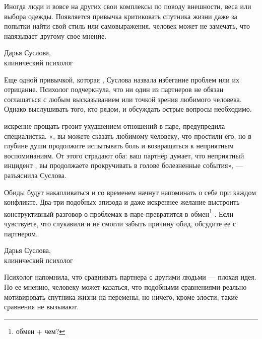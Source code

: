 \begin{fancyquotes}
    Иногда люди и вовсе  на других свои комплексы по поводу внешности, веса или выбора одежды. Появляется привычка критиковать спутника жизни даже за попытки найти свой стиль или самовыражения.  человек может не замечать, что навязывает другому свое мнение.

    \begin{flushright}
        Дарья Суслова,\\
        клинический психолог
    \end{flushright}
\end{fancyquotes}

Еще одной привычкой, которая  , Суслова назвала избегание проблем или их отрицание. Психолог подчеркнула, что ни один из партнеров не обязан соглашаться с любым высказыванием или точкой зрения любимого человека. Однако выслушивать того, кто рядом, и обсуждать острые вопросы необходимо.

 искренне прощать грозит ухудшением отношений в паре, предупредила специалистка. «, вы можете сказать любимому человеку, что простили его, но в глубине души продолжите испытывать боль и  возвращаться к неприятным воспоминаниям. От этого страдают оба: ваш партнёр думает, что неприятный инцидент , вы продолжаете прокручивать в голове болезненные события», — разъяснила Суслова.


\begin{fancyquotes}
    Обиды будут накапливаться и со временем начнут напоминать о себе при каждом конфликте. Два-три подобных эпизода и даже искреннее желание выстроить конструктивный разговор о проблемах в паре превратится в обмен\footnote{обмен + чем?} . Если чувствуете, что слукавили и не смогли забыть причину обид, обсудите ее с партнером.

    \begin{flushright}
        Дарья Суслова,\\
        клинический психолог
    \end{flushright}
\end{fancyquotes}

Психолог напомнила, что сравнивать партнера с другими людьми — плохая идея. По ее мнению, человеку может казаться, что подобными сравнениями реально мотивировать спутника жизни на перемены, но ничего, кроме злости, такие сравнения не вызывают.

